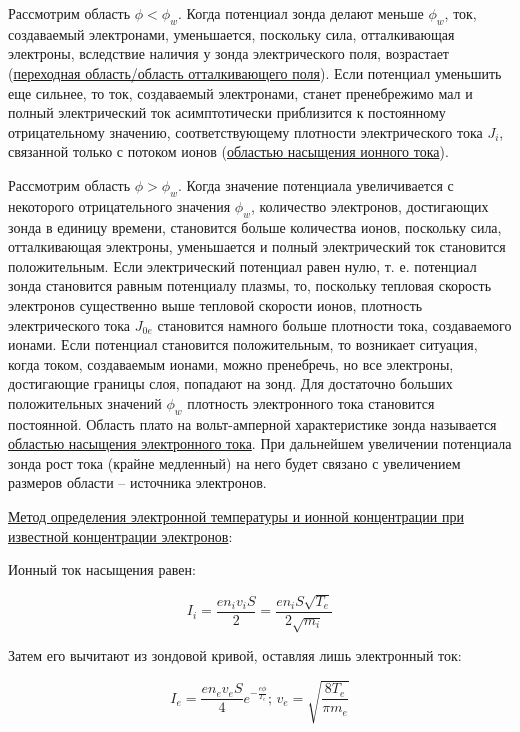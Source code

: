 \documentclass[10pt, a4paper]{article}
\begin{document}
Рассмотрим область $\phi<\phi_w$. Когда потенциал зонда делают меньше $\phi_w$, ток, создаваемый электронами, уменьшается, поскольку сила, отталкивающая электроны, вследствие наличия у зонда электрического поля, возрастает (\uline{переходная область/область отталкивающего поля}). Если потенциал уменьшить еще сильнее, то ток, создаваемый электронами, станет пренебрежимо мал и полный электрический ток асимптотически приблизится к постоянному отрицательному значению, соответствующему плотности электрического тока $J_i$, связанной только с потоком ионов (\uline{областью насыщения ионного тока}). 

Рассмотрим область $\phi>\phi_w$. Когда значение потенциала увеличивается с некоторого отрицательного значения $\phi_w$, количество электронов, достигающих зонда в единицу времени, становится больше количества ионов, поскольку сила, отталкивающая электроны, уменьшается и полный электрический ток становится положительным. Если электрический потенциал равен нулю, т. е. 
потенциал зонда становится равным потенциалу плазмы, то, поскольку тепловая скорость электронов существенно выше тепловой скорости ионов, плотность электрического тока $J_{0e}$ становится намного больше плотности тока, создаваемого ионами. Если потенциал становится положительным, то возникает ситуация, когда током, создаваемым ионами, можно пренебречь, но все электроны, достигающие границы слоя, попадают на зонд. Для достаточно больших положительных значений $\phi_w$ плотность электронного тока становится постоянной. Область плато на вольт-амперной характеристике зонда называется \uline{областью насыщения электронного тока}. При дальнейшем увеличении потенциала зонда рост тока (крайне медленный) на него будет связано с увеличением размеров области -- источника электронов.

\uline{Метод определения электронной температуры и ионной концентрации при известной концентрации электронов}:

Ионный ток насыщения равен:

\begin{equation*}
	I_i = \frac{en_iv_iS}{2} = \frac{en_iS\sqrt{T_e}}{2\sqrt{m_i}}
\end{equation*}

Затем его вычитают из зондовой кривой, оставляя лишь электронный ток:

\begin{equation*}
	I_e = \frac{en_ev_eS}{4}e^{-\frac{e\phi}{T_e}};\,v_e = \sqrt{\frac{8T_e}{\pi m_e}}
\end{equation*}
\end{document}
